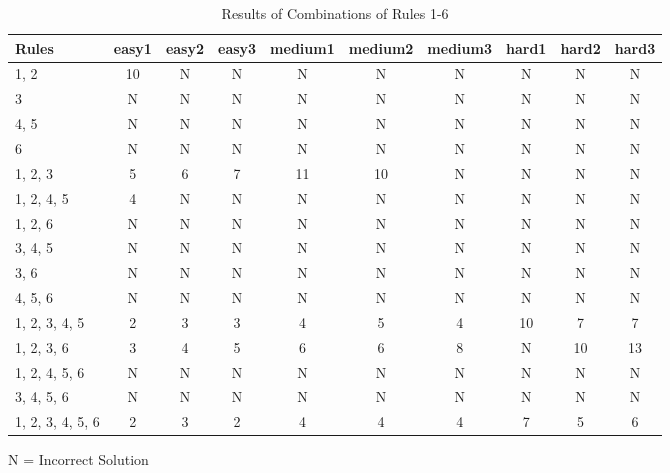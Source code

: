 \documentclass[twocolumn]{article}
\begin{document}
\begin{table*}[t]
\centering
\caption{Results of Combinations of Rules 1-6}
\label{Combinations-Table}
\begin{tabular}{@{}lccccccccc@{}}
Rules            & easy1 & easy2 & easy3 & medium1 & medium2 & medium3 & hard1 & hard2 & hard3 \\ \hline
1, 2             & 10    & N     & N     & N       & N       & N       & N     & N     & N     \\ \hline
3                & N     & N     & N     & N       & N       & N       & N     & N     & N     \\ \hline
4, 5             & N     & N     & N     & N       & N       & N       & N     & N     & N     \\ \hline
6                & N     & N     & N     & N       & N       & N       & N     & N     & N     \\ \hline
1, 2, 3          & 5     & 6     & 7     & 11      & 10      & N       & N     & N     & N     \\ \hline
1, 2, 4, 5       & 4     & N     & N     & N       & N       & N       & N     & N     & N     \\ \hline
1, 2, 6          & N     & N     & N     & N       & N       & N       & N     & N     & N     \\ \hline
3, 4, 5          & N     & N     & N     & N       & N       & N       & N     & N     & N     \\ \hline
3, 6             & N     & N     & N     & N       & N       & N       & N     & N     & N     \\ \hline
4, 5, 6          & N     & N     & N     & N       & N       & N       & N     & N     & N     \\ \hline
1, 2, 3, 4, 5    & 2     & 3     & 3     & 4       & 5       & 4       & 10    & 7     & 7     \\ \hline
1, 2, 3, 6       & 3     & 4     & 5     & 6       & 6       & 8       & N     & 10    & 13    \\ \hline
1, 2, 4, 5, 6    & N     & N     & N     & N       & N       & N       & N     & N     & N     \\ \hline
3, 4, 5, 6       & N     & N     & N     & N       & N       & N       & N     & N     & N     \\ \hline
1, 2, 3, 4, 5, 6 & 2     & 3     & 2     & 4       & 4       & 4       & 7     & 5     & 6    
\end{tabular}

N = Incorrect Solution
\end{table*}
\end{document}
